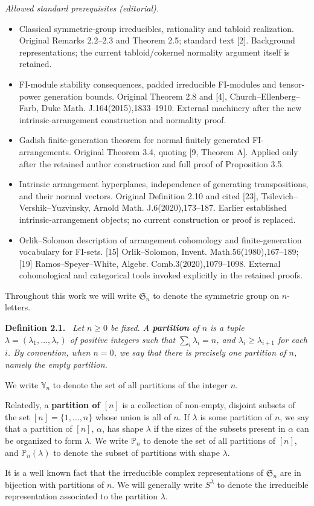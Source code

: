 \documentclass[10pt,a4paper]{article}
\newenvironment{sourceblock}[1]{\par\medskip\noindent\textbf{#1.}\ \itshape}{\par\medskip}
\begin{document}
\noindent\textit{Allowed standard prerequisites (editorial).}\begin{itemize}
\item Classical symmetric-group irreducibles, rationality and tabloid realization. Original Remarks 2.2–2.3 and Theorem 2.5; standard text [2]. Background representations; the current tabloid/cokernel normality argument itself is retained.
\item FI-module stability consequences, padded irreducible FI-modules and tensor-power generation bounds. Original Theorem 2.8 and [4], Church–Ellenberg–Farb, Duke Math. J.164(2015),1833–1910. External machinery after the new intrinsic-arrangement construction and normality proof.
\item Gadish finite-generation theorem for normal finitely generated FI-arrangements. Original Theorem 3.4, quoting [9, Theorem A]. Applied only after the retained author construction and full proof of Proposition 3.5.
\item Intrinsic arrangement hyperplanes, independence of generating transpositions, and their normal vectors. Original Definition 2.10 and cited [23], Tsilevich–Vershik–Yuzvinsky, Arnold Math. J.6(2020),173–187. Earlier established intrinsic-arrangement objects; no current construction or proof is replaced.
\item Orlik–Solomon description of arrangement cohomology and finite-generation vocabulary for FI-sets. [15] Orlik–Solomon, Invent. Math.56(1980),167–189; [19] Ramos–Speyer–White, Algebr. Comb.3(2020),1079–1098. External cohomological and categorical tools invoked explicitly in the retained proofs.
\end{itemize}\medskip
Throughout this work we will write $\mathfrak{S}_n$ to denote the symmetric group on $n$-letters.
\begin{sourceblock}{Definition 2.1}
Let $n\geq 0$ be fixed. A \textbf{partition} of $n$ is a tuple $\lambda=(\lambda_1,\ldots,\lambda_r)$ of positive integers such that $\sum_i\lambda_i=n$, and $\lambda_i\geq\lambda_{i+1}$ for each $i$. By convention, when $n=0$, we say that there is precisely one partition of $n$, namely the empty partition.

We write $\mathbb{Y}_n$ to denote the set of all partitions of the integer $n$.

Relatedly, a \textbf{partition of $[n]$} is a collection of non-empty, disjoint subsets of the set $[n]=\{1,\ldots,n\}$ whose union is all of $n$. If $\lambda$ is some partition of $n$, we say that a partition of $[n]$, $\alpha$, has shape $\lambda$ if the sizes of the subsets present in $\alpha$ can be organized to form $\lambda$. We write $\mathbb{P}_n$ to denote the set of all partitions of $[n]$, and $\mathbb{P}_n(\lambda)$ to denote the subset of partitions with shape $\lambda$.
\end{sourceblock}
It is a well known fact that the irreducible complex representations of $\mathfrak{S}_n$ are in bijection with partitions of $n$. We will generally write $S^\lambda$ to denote the irreducible representation associated to the partition $\lambda$.
\end{document}
